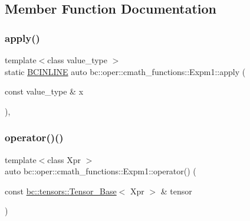 \subsection{Member Function Documentation}
\mbox{\label{structbc_1_1oper_1_1cmath__functions_1_1Expm1_a37bd32c7eb051fab0f756f02b1b5dcd4}} 
\subsubsection{\texorpdfstring{apply()}{apply()}}
{\footnotesize\ttfamily template$<$class value\+\_\+type $>$ \\
static \hyperlink{common_8h_a6699e8b0449da5c0fafb878e59c1d4b1}{B\+C\+I\+N\+L\+I\+NE} auto bc\+::oper\+::cmath\+\_\+functions\+::\+Expm1\+::apply (\begin{DoxyParamCaption}\item[{const value\+\_\+type \&}]{x }\end{DoxyParamCaption})\hspace{0.3cm}{\ttfamily [inline]}, {\ttfamily [static]}}

\mbox{\label{structbc_1_1oper_1_1cmath__functions_1_1Expm1_ab32c22d765675d58c6291a6716231d41}} 
\subsubsection{\texorpdfstring{operator()()}{operator()()}\hspace{0.1cm}{\footnotesize\ttfamily [1/3]}}
{\footnotesize\ttfamily template$<$class Xpr $>$ \\
auto bc\+::oper\+::cmath\+\_\+functions\+::\+Expm1\+::operator() (\begin{DoxyParamCaption}\item[{const \hyperlink{classbc_1_1tensors_1_1Tensor__Base}{bc\+::tensors\+::\+Tensor\+\_\+\+Base}$<$ Xpr $>$ \&}]{tensor }\end{DoxyParamCaption})\hspace{0.3cm}{\ttfamily [inline]}}

